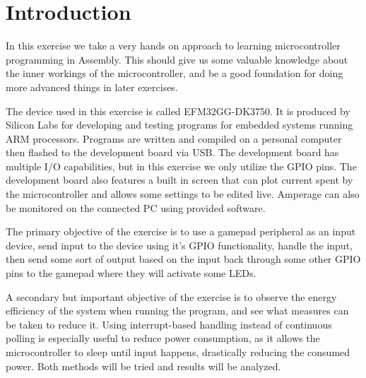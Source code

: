 \chapter{Introduction}
In this exercise we take a very hands on approach to learning microcontroller programming in Assembly. This should give us some valuable knowledge about the inner workings of the microcontroller, and be a good foundation for doing more advanced things in later exercises.

The device used in this exercise is called EFM32GG-DK3750. It is produced by Silicon Labs for developing and testing programs for embedded systems running ARM processors. Programs are written and compiled on a personal computer then flashed to the development board via USB. The development board has multiple I/O capabilities, but in this exercise we only utilize the GPIO pins. The development board also features a built in screen that can plot current spent by the microcontroller and allows some settings to be edited live. Amperage can also be monitored on the connected PC using provided software.

The primary objective of the exercise is to use a gamepad peripheral as an input device, send input to the device using it's GPIO functionality, handle the input, then send some sort of output based on the input back through some other GPIO pins to the gamepad where they will activate some LEDs.

A secondary but important objective of the exercise is to observe the energy efficiency of the system when running the program, and see what measures can be taken to reduce it. Using interrupt-based handling instead of continuous polling is especially useful to reduce power consumption, as it allows the microcontroller to sleep until input happens, drastically reducing the consumed power. Both methods will be tried and results will be analyzed.
